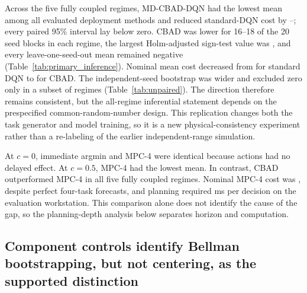 \documentclass[11pt]{article}
\newcommand{\method}{MD-CBAD-DQN\xspace}
\begin{document}
\begin{table}[H]
\centering
\caption{Sensitivity of the primary CBAD--DQN comparison to ignoring the prespecified model-seed matching. The two groups of 20 seed means are resampled independently. These intervals quantify the loss of precision when the common-random-number blocks are discarded and are not the primary analysis.}
\label{tab:unpaired}
\resizebox{0.80\textwidth}{!}{}
\end{table}

Across the five fully coupled regimes, \method had the lowest mean among all evaluated deployment methods and reduced standard-DQN cost by \PhysicalCBADMinPct--\PhysicalCBADMaxPct; every paired 95\% interval lay below zero. CBAD was lower for 16--18 of the 20 seed blocks in each regime, the largest Holm-adjusted sign-test value was \PrimaryHolmPMax, and every leave-one-seed-out mean remained negative (Table~\ref{tab:primary_inference}). Nominal mean cost decreased from \PhysicalNominalDQNCost for standard DQN to \PhysicalNominalCBADCost for CBAD. The independent-seed bootstrap was wider and excluded zero only in a subset of regimes (Table~\ref{tab:unpaired}). The direction therefore remains consistent, but the all-regime inferential statement depends on the prespecified common-random-number design. This replication changes both the task generator and model training, so it is a new physical-consistency experiment rather than a re-labeling of the earlier independent-range simulation.

At $c=0$, immediate argmin and MPC-4 were identical because actions had no delayed effect. At $c=0.5$, MPC-4 had the lowest mean. In contrast, CBAD outperformed MPC-4 in all five fully coupled regimes. Nominal MPC-4 cost was \MPCNominalCost, despite perfect four-task forecasts, and planning required \MPCNominalPlanningMs{} ms per decision on the evaluation workstation. This comparison alone does not identify the cause of the gap, so the planning-depth analysis below separates horizon and computation.

\subsection{Component controls identify Bellman bootstrapping, but not centering, as the supported distinction}

\begin{table}[H]
\centering
\caption{Nominal component and backbone controls. All models use 20 prespecified model-seed blocks, identical real-interaction budgets, and the same held-out traces. Full-action Q applies uncentered Bellman targets; immediate advantage centers analytical immediate costs without bootstrapping. Paired differences are relative to the matched reference named in the third column.}
\label{tab:extended_ablation}
\resizebox{\textwidth}{!}{}
\end{table}
\end{document}

